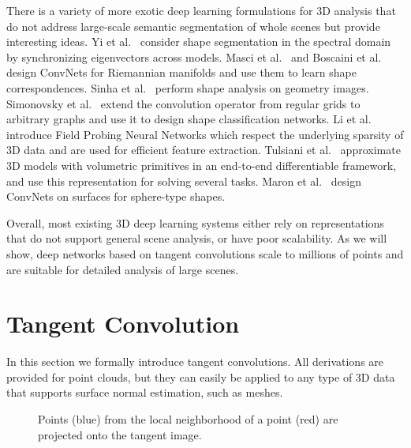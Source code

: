 \documentclass[10pt,twocolumn,letterpaper]{article}
\begin{document}
There is a variety of more exotic deep learning formulations for 3D analysis that do not address large-scale semantic segmentation of whole scenes but provide interesting ideas.
Yi et al.~\cite{yi17} consider shape segmentation in the spectral domain by synchronizing eigenvectors across models.
Masci et al.~\cite{masci15} and Boscaini et al.~\cite{Boscaini2016} design ConvNets for Riemannian manifolds and use them to learn shape correspondences.
Sinha et al.~\cite{sinha16} perform shape analysis on geometry images.
Simonovsky et al.~\cite{simonovsky17} extend the convolution operator from regular grids to arbitrary graphs and use it to design shape classification networks.
Li et al.~\cite{li16:NIPS} introduce Field Probing Neural Networks which respect the underlying sparsity of 3D data and are used for efficient feature extraction.
Tulsiani et al.~\cite{tulsiani17} approximate 3D models with volumetric primitives in an end-to-end differentiable framework, and use this representation for solving several tasks.
Maron et al.~\cite{maron17} design ConvNets on surfaces for sphere-type shapes.

Overall, most existing 3D deep learning systems either rely on representations that do not support general scene analysis, or have poor scalability. As we will show, deep networks based on tangent convolutions scale to millions of points and are suitable for detailed analysis of large scenes.
 
\section{Tangent Convolution}
\label{sec:parametrization}


In this section we formally introduce tangent convolutions. All derivations are provided for point clouds, but they can easily be applied to any type of 3D data that supports surface normal estimation, such as meshes.

\begin{figure}
\centering
{}
\caption{Points  (blue) from the local neighborhood of a point  (red) are projected onto the tangent image.}
\label{fig:tangent_image}
\end{figure}
\end{document}
